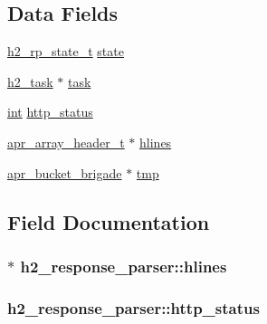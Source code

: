 \subsection*{Data Fields}
\begin{DoxyCompactItemize}
\item 
\hyperlink{h2__from__h1_8c_ab57c457e2d72c3fee19ac0cd13e114c2}{h2\+\_\+rp\+\_\+state\+\_\+t} \hyperlink{structh2__response__parser_a2dca95fd3da88f6198a4a0ee29273ae3}{state}
\item 
\hyperlink{structh2__task}{h2\+\_\+task} $\ast$ \hyperlink{structh2__response__parser_a884c4a419a3bdc78b5f60c15b62f07e0}{task}
\item 
\hyperlink{pcre_8txt_a42dfa4ff673c82d8efe7144098fbc198}{int} \hyperlink{structh2__response__parser_a4c3db6b762b6471d93b9e8eff7f0892e}{http\+\_\+status}
\item 
\hyperlink{structapr__array__header__t}{apr\+\_\+array\+\_\+header\+\_\+t} $\ast$ \hyperlink{structh2__response__parser_af9174b48d6064ff9e262fb315ff650af}{hlines}
\item 
\hyperlink{structapr__bucket__brigade}{apr\+\_\+bucket\+\_\+brigade} $\ast$ \hyperlink{structh2__response__parser_ada2850b1f7954862e6c79804e071d785}{tmp}
\end{DoxyCompactItemize}


\subsection{Field Documentation}
\subsubsection[{\texorpdfstring{hlines}{hlines}}]{$\ast$ h2\+\_\+response\+\_\+parser\+::hlines}\hypertarget{structh2__response__parser_af9174b48d6064ff9e262fb315ff650af}{}\label{structh2__response__parser_af9174b48d6064ff9e262fb315ff650af}
\subsubsection[{\texorpdfstring{http\+\_\+status}{http_status}}]{ h2\+\_\+response\+\_\+parser\+::http\+\_\+status}\hypertarget{structh2__response__parser_a4c3db6b762b6471d93b9e8eff7f0892e}{}\label{structh2__response__parser_a4c3db6b762b6471d93b9e8eff7f0892e}

